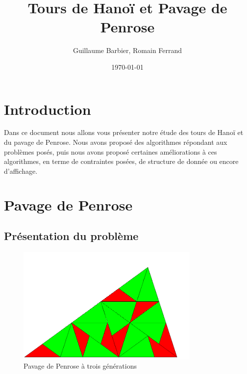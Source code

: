 \documentclass[a4paper,11pt]{article}
\begin{document}
\begin{titlepage}
  \title{Tours de Hanoï et Pavage de Penrose}
  \author{Guillaume Barbier, Romain Ferrand}
  \date{\today}

  \maketitle

  \begin{abstract}
    
  \end{abstract}
\end{titlepage}

\section*{Introduction}
\begin{center}
  Dans ce document nous allons vous présenter notre étude des tours de Hanoï et du
  pavage de Penrose. Nous avons proposé des algorithmes répondant aux problèmes posés, puis
  nous avons proposé certaines améliorations à ces algorithmes, en terme de contraintes posées,
  de structure de donnée ou encore d'affichage.
\end{center}

\section{Pavage de Penrose}
\label{chap:penrose}



\subsection{Présentation du problème}
\label{sec:prezPenrose}
\begin{figure}
  \centering
  \includegraphics[width=0.8\textwidth]{penrose_example.png}
  \caption{Pavage de Penrose à trois générations}
  \label{fig:penrose_example}
\end{figure}
\end{document}

